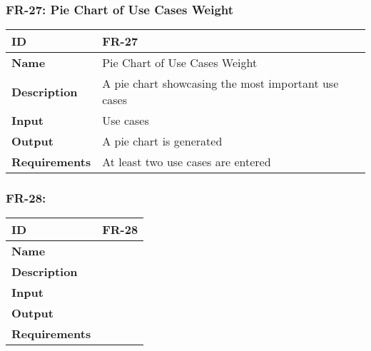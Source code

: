     

    \subsubsection{FR-27: Pie Chart of Use Cases Weight}
    \begin{center}
        \begin{tabularx}{\textwidth}{|l|X|}
            \hline
            \textbf{ID} & FR-27 \\
            \hline
            \textbf{Name} & Pie Chart of Use Cases Weight \\
            \hline
            \textbf{Description} & A pie chart showcasing the most important use cases \\
            \hline
            \textbf{Input} & Use cases \\
            \hline
            \textbf{Output} & A pie chart is generated \\
            \hline
            \textbf{Requirements} & At least two use cases are entered \\
            \hline
        \end{tabularx}
    \end{center}
    
    

    \subsubsection{FR-28: }
    \begin{center}
        \begin{tabularx}{\textwidth}{|l|X|}
            \hline
            \textbf{ID} & FR-28 \\
            \hline
            \textbf{Name} &  \\
            \hline
            \textbf{Description} &  \\
            \hline
            \textbf{Input} &  \\
            \hline
            \textbf{Output} &  \\
            \hline
            \textbf{Requirements} &  \\
            \hline
        \end{tabularx}
    \end{center}
    \newpage
    
